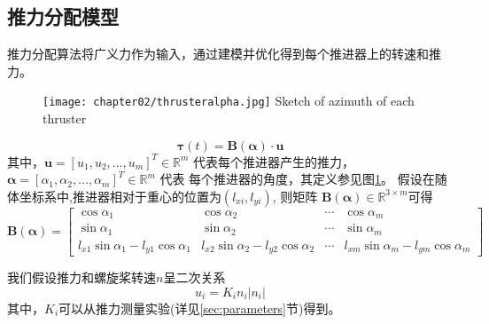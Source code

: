 \subsection{推力分配模型}
推力分配算法将广义力作为输入，通过建模并优化得到每个推进器上的转速和推力。

\begin{figure}[!htp]
  \centering
  \texttt{[image: chapter02/thrusteralpha.jpg]}
    {Sketch of azimuth of each thruster}
  \label{fig:thrusteralpha}
\end{figure}


\begin{equation}
  \label{eq:eachthruster}
    {\bm{\tau}}(t) = \bm{B}(\bm{\alpha} )  \cdot \bm{u}
\end{equation}
其中，$\bm{u}=[u_1,u_2, \dots, u_m]^T \in \mathbb{R}^m$ 代表每个推进器产生的推力，
$\bm{\alpha}=[\alpha_1, \alpha_2, \dots, \alpha_m ]^T \in \mathbb{R}^m$ 代表
每个推进器的角度，其定义参见图\ref{fig:thrusteralpha}。
假设在随体坐标系中,推进器相对于重心的位置为$(l_{xi},l_{yi})$, 则矩阵
$\bm{B}(\bm{\alpha} ) \in \mathbb{R}^{3 \times m}$可得
\begin{equation}
  \label{eq:Balpha}
\bm{B}(\bm{\alpha})=\left[\begin{array}{cccc}{
\cos \alpha_{1}} & {\cos \alpha_{2}} & \cdots & {\cos \alpha_{m}} \\
{\sin \alpha_{1}} & {\sin \alpha_{2}}  & \cdots & {\sin \alpha_{m}} \\
{l_{x 1} \sin \alpha_{1}-l_{y 1} \cos \alpha_{1}} &
{l_{x 2} \sin \alpha_{2}-l_{y 2} \cos \alpha_{2}} &
\cdots  &
{l_{x m} \sin \alpha_{m}-l_{y m} \cos \alpha_{m}}\end{array}\right]
\end{equation}

我们假设推力和螺旋桨转速$n$呈二次关系
\begin{equation}
  \label{eq:thrustrotation}
    u_i= K_i n_i |n_i|
\end{equation}
其中，$K_i$可以从推力测量实验(详见\ref{sec:parameters}节)得到。

